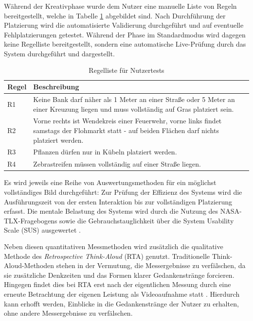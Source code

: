 Während der Kreativphase wurde dem Nutzer eine manuelle Liste von Regeln bereitgestellt, welche in Tabelle \ref{tab:testrules} abgebildet sind. Nach Durchführung der Platzierung wird die automatisierte Validierung durchgeführt und auf eventuelle Fehlplatzierungen getestet. Während der Phase im Standardmodus wird dagegen keine Regelliste bereitgestellt, sondern eine automatische Live-Prüfung durch das System durchgeführt und dargestellt.

\begin{table}[!h]
\begin{center}
    \begin{tabular}{ | l | p{14cm} | }
      \hline
      Regel & Beschreibung \\ \hline \hline
      R1 & Keine Bank darf näher als 1 Meter an einer Straße oder 5 Meter an einer Kreuzung liegen und muss vollständig auf Gras platziert sein. \\ \hline
      R2 & Vorne rechts ist Wendekreis einer Feuerwehr, vorne links findet samstags der Flohmarkt statt - auf beiden Flächen darf nichts platziert werden. \\ \hline
      R3 & Pflanzen dürfen nur in Kübeln platziert werden. \\ \hline
      R4 & Zebrastreifen müssen vollständig auf einer Straße liegen. \\ \hline
    \end{tabular}
\caption{Regelliste für Nutzertests}
\label{tab:testrules}
\end{center}
\end{table}

Es wird jeweils eine Reihe von Auswertungsmethoden für ein möglichst vollständiges Bild durchgeführt: Zur Prüfung der Effizienz des Systems wird die Ausführungszeit von der ersten Interaktion bis zur vollständigen Platzierung erfasst. Die mentale Belastung des Systems wird durch die Nutzung des NASA-TLX-Fragebogens sowie die Gebrauchstauglichkeit über die System Usability Scale (SUS) ausgewertet \parencite{hartDevelopmentNASATLXTask1988}.

Neben diesen quantitativen Messmethoden wird zusätzlich die qualitative Methode des \textit{Retrospective Think-Aloud} (RTA) genutzt. Traditionelle Think-Aloud-Methoden stehen in der Vermutung, die Messergebnisse zu verfälschen, da sie zusätzliche Denkzeiten und das Formen klarer Gedankenstränge forcieren. Hingegen findet dies bei RTA erst nach der eigentlichen Messung durch eine erneute Betrachtung der eigenen Leistung als Videoaufnahme statt \parencite[S. 90]{albertMeasuringUserExperience2022}. Hierdurch kann erhofft werden, Einblicke in die Gedankenstränge der Nutzer zu erhalten, ohne andere Messergebnisse zu verfälschen. 

